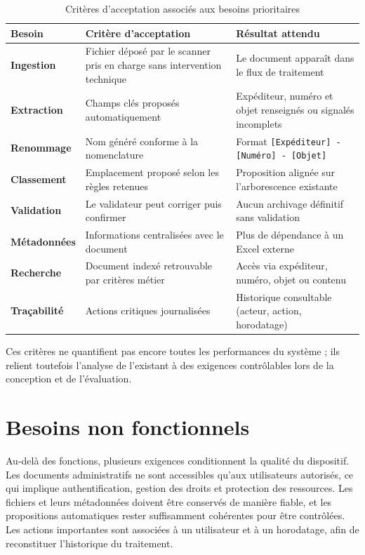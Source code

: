 \documentclass[12pt,a4paper]{report}
\newcommand{\tableheader}[1]{\textbf{\small #1}}
\begin{document}
\begin{table}[htbp]
\centering
\caption{Critères d'acceptation associés aux besoins prioritaires}
\label{tab:criteres-acceptation-ch3}
\small
\renewcommand{\arraystretch}{1.55}
\begingroup
{}
\begin{tabularx}{\textwidth}{@{}>{\bfseries}L{2.4cm}YY@{}}
\toprule
{}
\tableheader{Besoin} &
\tableheader{Critère d'acceptation} &
\tableheader{Résultat attendu} \\
\midrule
Ingestion &
Fichier déposé par le scanner pris en charge sans intervention technique &
Le document apparaît dans le flux de traitement \\
Extraction &
Champs clés proposés automatiquement &
Expéditeur, numéro et objet renseignés ou signalés incomplets \\
Renommage &
Nom généré conforme à la nomenclature &
Format \texttt{[Expéditeur] - [Numéro] - [Objet]} \\
Classement &
Emplacement proposé selon les règles retenues &
Proposition alignée sur l'arborescence existante \\
Validation &
Le validateur peut corriger puis confirmer &
Aucun archivage définitif sans validation \\
Métadonnées &
Informations centralisées avec le document &
Plus de dépendance à un Excel externe \\
Recherche &
Document indexé retrouvable par critères métier &
Accès via expéditeur, numéro, objet ou contenu \\
Traçabilité &
Actions critiques journalisées &
Historique consultable (acteur, action, horodatage) \\
\bottomrule
\end{tabularx}
\endgroup
\end{table}

Ces critères ne quantifient pas encore toutes les performances du système ; ils relient toutefois l'analyse de l'existant à des exigences contrôlables lors de la conception et de l'évaluation.

\section{Besoins non fonctionnels}
Au-delà des fonctions, plusieurs exigences conditionnent la qualité du dispositif. Les documents administratifs ne sont accessibles qu'aux utilisateurs autorisés, ce qui implique authentification, gestion des droits et protection des ressources. Les fichiers et leurs métadonnées doivent être conservés de manière fiable, et les propositions automatiques rester suffisamment cohérentes pour être contrôlées. Les actions importantes sont associées à un utilisateur et à un horodatage, afin de reconstituer l'historique du traitement.
\end{document}
